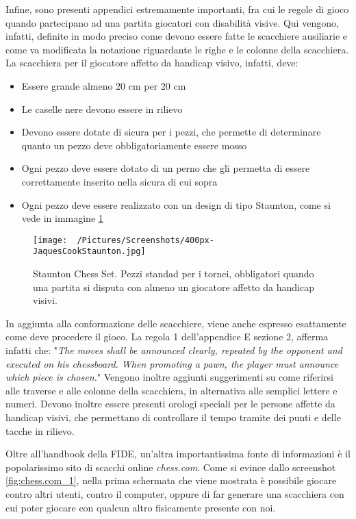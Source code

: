\documentclass[12pt]{book}
\begin{document}
Infine, sono presenti appendici estremamente importanti, fra cui le
regole di gioco quando partecipano ad una partita giocatori con 
disabilità visive. Qui vengono,
infatti, definite in modo preciso come devono essere fatte le
scacchiere ausiliarie e come va modificata la notazione riguardante le
righe e le colonne della scacchiera. La scacchiera per il giocatore
affetto da handicap visivo, infatti, deve:

\begin{itemize}
  \item Essere grande almeno 20 cm per 20 cm
  \item Le caselle nere devono essere in rilievo
  \item Devono essere dotate di sicura per i pezzi, che permette di
    determinare quanto un pezzo deve obbligatoriamente essere mosso
  \item Ogni pezzo deve essere dotato di un perno che gli permetta di
    essere correttamente inserito nella sicura di cui sopra
  \item Ogni pezzo deve essere realizzato con un design di tipo
    Staunton, come si vede in immagine \ref{fig:pezzi_staunton}
\end{itemize}

\begin{figure}[h]
  \caption{Staunton Chess Set. Pezzi standad per i tornei, obbligatori
  quando una partita si disputa con almeno un giocatore affetto da handicap visivi.}
  \centering
  \label{fig:pezzi_staunton}
  \texttt{[image: ~/Pictures/Screenshots/400px-JaquesCookStaunton.jpg]}
\end{figure} 

In aggiunta alla conformazione delle scacchiere, viene anche espresso
esattamente come deve procedere il gioco. La regola 1 dell'appendice E
sezione 2, afferma infatti che: "\textit{The moves shall be announced clearly, repeated by the opponent and executed on his
chessboard. When promoting a pawn, the player must announce which piece is
chosen.}" Vengono inoltre aggiunti suggerimenti su come riferirsi alle
traverse e alle colonne della scacchiera, in alternativa alle semplici
lettere e numeri. Devono inoltre essere presenti orologi speciali per
le persone affette da handicap visivi, che permettano di controllare
il tempo tramite dei punti e delle tacche in rilievo.

Oltre all'handbook della FIDE, un'altra importantissima fonte di
informazioni è il popolarissimo sito di scacchi online
\textit{chess.com}. Come si evince dallo screenshot
\ref{fig:chess.com_1}, nella prima schermata che viene mostrata è
possibile giocare contro altri utenti, contro il computer, oppure di
far generare una scacchiera con cui poter giocare con qualcun altro
fisicamente presente con noi.
\end{document}

